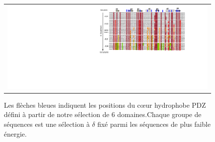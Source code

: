       \caption{\small Séquences Tiam1 obtenues avec un delta des énergies de références à -0,4,-0,2,0,0.2 et 0,4 et la structure native.Les hydrophobes pour des deltas de -0,4,-0,2,0,0.2 et 0,4 sont représentés par un dégradé allant du rouge foncé au vert clair, en passant par le jaune.}


    \begin{figure}[!htbp]
      \centering
      \begin{tabular}{c}
        \includegraphics[width=20cm]{titration/alignTiam1.png} \\
      \end{tabular}      
      \label{titrationAlignTiam1}
            {\footnotesize Les flèches bleues indiquent les positions du cœur hydrophobe PDZ défini à partir de notre sélection de 6 domaines.Chaque groupe de séquences est une sélection à $\delta$ fixé parmi les séquences de plus faible énergie.}

    \end{figure}

